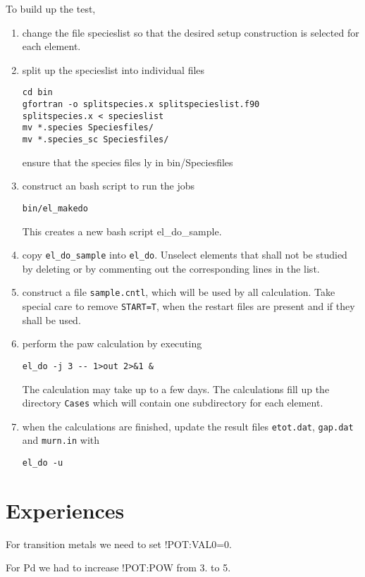 \documentclass{book}
\begin{document}
To build up the test, 
\begin{enumerate}
\item change the file specieslist so that the desired setup
  construction is selected for each element.
%
\item split up the specieslist into individual files
\begin{verbatim}
cd bin
gfortran -o splitspecies.x splitspecieslist.f90
splitspecies.x < specieslist 
mv *.species Speciesfiles/
mv *.species_sc Speciesfiles/
\end{verbatim}
ensure that the species files ly in bin/Speciesfiles
%
\item construct an bash script to run the jobs
\begin{verbatim}
bin/el_makedo
\end{verbatim}
This creates a new bash script el\_do\_sample. 
%
\item copy \verb|el_do_sample| into \verb|el_do|. Unselect elements
  that shall not be studied by deleting or by commenting out the
  corresponding lines in the list.
%
\item construct a file \verb|sample.cntl|, which will be used by all
  calculation. Take special care to remove \verb|START=T|, when the
  restart files are present and if they shall be used.
%
\item perform the paw calculation by executing 
\begin{verbatim}
el_do -j 3 -- 1>out 2>&1 &
\end{verbatim}
The calculation may take up to a few days. The calculations fill up
the directory \verb|Cases| which will contain one subdirectory for
each element.
%
\item when the calculations are finished, update the result files \verb|etot.dat|, \verb|gap.dat| and \verb|murn.in| with
\begin{verbatim}
el_do -u
\end{verbatim}

\end{enumerate}

\section*{Experiences}
For transition metals we need to set !POT:VAL0=0. 

For Pd we had to increase  !POT:POW from 3. to 5.
\end{document}
